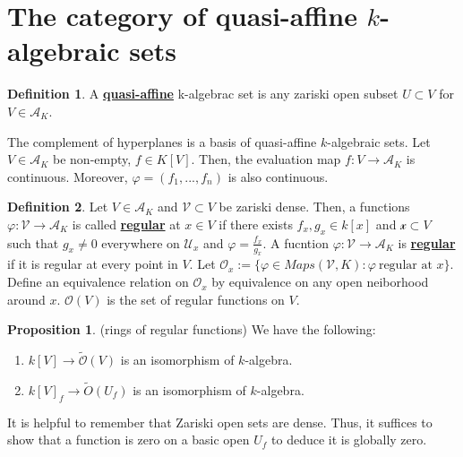 \documentclass{article}
\theoremstyle{definition}
\theoremstyle{definition}
\newtheorem{definition}{Definition}[theorem]
\theoremstyle{definition}
\theoremstyle{definition}
\newtheorem{proposition}{Proposition}[theorem]
\theoremstyle{definition}
\theoremstyle{definition}
\theoremstyle{definition}
\begin{document}
\section{The category of quasi-affine $k$-algebraic sets}

\begin{tcolorbox}[colback=purple!5!white,colframe=purple!75!black]
\begin{definition}
A \underline{\textbf{quasi-affine}} k-algebrac set is any zariski open subset $U\subset V$ for $V\in \mathcal{A}_K$. 
\end{definition}
\end{tcolorbox}
The complement of hyperplanes is a basis of quasi-affine $k$-algebraic sets.
Let $V\in \mathcal{A}_K$ be non-empty, $f\in K[V]$. Then, the evaluation map $f: V\to \mathcal{A}_K$ is continuous. Moreover, $\varphi=(f_1,...,f_n)$ is also continuous. 


\begin{tcolorbox}[colback=purple!5!white,colframe=purple!75!black]
\begin{definition}
Let $V\in \mathcal{A}_K$ and $\mathcal{V}\subset V$ be zariski dense. Then, a functions $\varphi: \mathcal{V}\to \mathcal{A}_K$ is called \underline{\textbf{regular}} at $x \in V$ if there exists $f_x,g_x\in k[x]$ and $\mathcal{x}\subset V$ such that $g_x\neq 0$ everywhere on $\mathcal{U}_x$ and $\varphi=\frac{f_x}{g_x}$. A fucntion $\varphi: \mathcal V\to \mathcal{A}_K$ is \underline{\textbf{regular}} if it is regular at every point in $V$. Let $\mathcal{O}_x:=\{ \varphi\in Maps(\mathcal{V}, K):\varphi \ \textrm{regular at } x \}$. Define an equivalence relation on $\mathcal{O}_x$ by equivalence on any open neiborhood around $x$. $\mathcal{O}(V)$ is the set of regular functions on $V$. 
\end{definition}
\end{tcolorbox}


\begin{tcolorbox}[colback=blue!5!white,colframe=blue!30!white]
\begin{proposition}
(rings of regular functions) We have the following:
\begin{enumerate}
    \item $k[V]\to \mathcal{\tilde{O}}(V)$ is an isomorphism of $k$-algebra.
    \item $k[V]_f\to \tilde{O}(U_f)$ is an isomorphism of $k$-algebra. 
\end{enumerate}
\end{proposition}
\end{tcolorbox}
It is helpful to remember that Zariski open sets are dense. Thus, it suffices to show that a function is zero on a basic open $U_f$ to deduce it is globally zero. 
\end{document}
